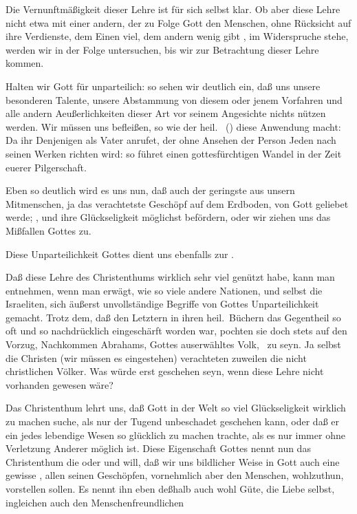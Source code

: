 Die Vernunftmäßigkeit dieser Lehre ist für sich selbst klar. Ob aber diese Lehre nicht etwa mit einer andern, der zu Folge Gott den Menschen, ohne Rücksicht auf ihre Verdienste, dem Einen viel, dem andern wenig gibt \usw , im Widerspruche stehe, werden wir in der Folge untersuchen, bis wir zur Betrachtung dieser Lehre kommen.

\begin{aufza}
\item Halten wir Gott für unparteilich: so sehen wir deutlich ein, daß uns unsere besonderen Talente, unsere Abstammung von diesem oder jenem Vorfahren und alle andern Aeußerlichkeiten dieser Art vor seinem Angesichte nichts nützen werden. Wir müssen uns  befleißen, so wie der heil.\  () diese Anwendung macht: Da ihr Denjenigen als Vater anrufet, der ohne Ansehen der Person Jeden nach seinen Werken richten wird: so führet einen gottesfürchtigen Wandel in der Zeit euerer Pilgerschaft.
\item Eben so deutlich wird es uns nun, daß auch der geringste aus unsern Mitmenschen, ja das verachtetste Geschöpf auf dem Erdboden, von Gott geliebet werde; , und ihre Glückseligkeit möglichst befördern, oder wir ziehen uns das Mißfallen Gottes zu.
\item Diese Unparteilichkeit Gottes dient uns ebenfalls zur .
\end{aufza}

Daß diese Lehre des Christenthums wirklich sehr viel genützt habe, kann man entnehmen, wenn man erwägt, wie so viele andere Nationen, und selbst die Israeliten, sich äußerst unvollständige Begriffe von Gottes Unparteilichkeit gemacht. Trotz dem, daß den Letztern in ihren heil.\ Büchern das Gegentheil so oft und so nachdrücklich eingeschärft worden war, pochten sie doch stets auf den Vorzug, Nachkommen Abrahams, Gottes auserwähltes Volk, \udgl\  zu seyn. Ja selbst die Christen (wir müssen es eingestehen) verachteten zuweilen die nicht christlichen Völker. Was würde erst geschehen seyn, wenn diese Lehre nicht vorhanden gewesen wäre?~

Das Christenthum lehrt uns, daß Gott in der Welt so viel Glückseligkeit wirklich zu machen suche, als nur der Tugend unbeschadet geschehen kann, oder daß er ein jedes lebendige Wesen so glücklich zu machen trachte, als es nur immer ohne Verletzung Anderer möglich ist. Diese Eigenschaft Gottes nennt nun das Christenthum die  oder  und will, daß wir uns bildlicher Weise in Gott auch eine gewisse , allen seinen Geschöpfen, vornehmlich aber den Menschen, wohlzuthun, vorstellen sollen. Es nennt ihn eben deßhalb auch wohl Güte, die Liebe selbst, ingleichen auch den Menschenfreundlichen \usw\

